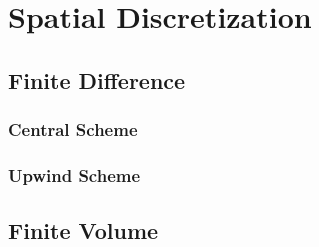 \section{Spatial Discretization}

\subsection{Finite Difference}

\subsubsection{Central Scheme}

\subsubsection{Upwind Scheme}

\subsection{Finite Volume}
